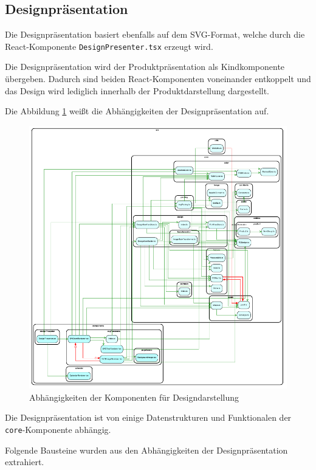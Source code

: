 
\subsection{Designpräsentation}
Die Designpräsentation basiert ebenfalls auf dem SVG-Format, welche durch die React-Komponente \lstinline|DesignPresenter.tsx| erzeugt wird. 

Die Designpräsentation wird der Produktpräsentation als Kindkomponente übergeben. Dadurch sind beiden React-Komponenten voneinander entkoppelt und das Design wird lediglich innerhalb der Produktdarstellung dargestellt.

Die Abbildung \ref{fig:Designdarstellung} weißt die Abhängigkeiten der Designpräsentation auf.

\begin{figure}[H]
    \centering
    \includegraphics{diagrams/Ist-Architektur/design-presenter-analysis.pdf}
    \caption{Abhängigkeiten der Komponenten für Designdarstellung}
    \label{fig:Designdarstellung}
\end{figure}

Die Designpräsentation ist von einige Datenstrukturen und Funktionalen der \lstinline|core|-Komponente abhängig. 

Folgende Bausteine wurden aus den Abhängigkeiten der Designpräsentation extrahiert.
\begin{multicols}{2}

\end{multicols}